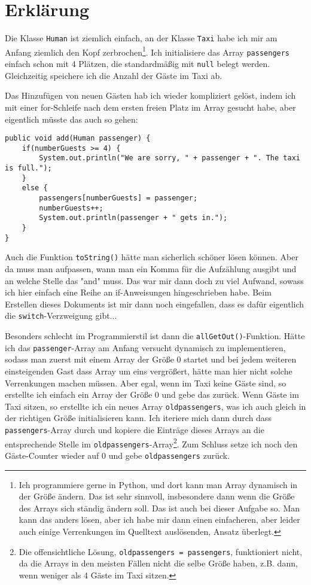 \documentclass{article}
\begin{document}
	\section*{Erklärung}
	Die Klasse \texttt{Human} ist ziemlich einfach, an der Klasse \texttt{Taxi} habe ich mir am Anfang ziemlich den Kopf zerbrochen\footnote{Ich programmiere gerne in Python, und dort kann man Array dynamisch in der Größe ändern. Das ist sehr sinnvoll, insbesondere dann wenn die Größe des Arrays sich ständig ändern soll. Das ist auch bei dieser Aufgabe so. Man kann das anders lösen, aber ich habe mir dann einen einfacheren, aber leider auch einige Verrenkungen im Quelltext auslösenden, Ansatz überlegt.}. Ich initialisiere das Array \texttt{passengers} einfach schon mit 4 Plätzen, die standardmäßig mit \texttt{null} belegt werden. Gleichzeitig speichere ich die Anzahl der Gäste im Taxi ab. 
	
	Das Hinzufügen von neuen Gästen hab ich wieder kompliziert gelöst, indem ich mit einer for-Schleife nach dem ersten freien Platz im Array gesucht habe, aber eigentlich müsste das auch so gehen:
	\begin{lstlisting}[style=java]
public void add(Human passenger) {
	if(numberGuests >= 4) {
		System.out.println("We are sorry, " + passenger + ". The taxi is full.");
	}
	else {
		passengers[numberGuests] = passenger;
		numberGuests++;
		System.out.println(passenger + " gets in.");
	}
}	
	\end{lstlisting}

	Auch die Funktion \texttt{toString()} hätte man sicherlich schöner lösen können. Aber da muss man aufpassen, wann man ein Komma für die Aufzählung ausgibt und an welche Stelle das "and" muss. Das war mir dann doch zu viel Aufwand, sowass ich  hier einfach eine Reihe an if-Anweisungen hingeschrieben habe. Beim Erstellen dieses Dokuments ist mir dann noch eingefallen, dass es dafür eigentlich die \texttt{switch}-Verzweigung gibt...
	
	Besonders schlecht im Programmierstil ist dann die \texttt{allGetOut()}-Funktion. Hätte ich das \texttt{passenger}-Array am Anfang versucht dynamisch zu implementieren, sodass man zuerst mit einem Array der Größe 0 startet und bei jedem weiteren einsteigenden Gast dass Array um eins vergrößert, hätte man hier nicht solche Verrenkungen machen müssen. Aber egal, wenn im Taxi keine Gäste sind, so erstellte ich einfach ein Array der Größe 0 und gebe das zurück. Wenn Gäste im Taxi sitzen, so erstellte ich ein neues Array \texttt{oldpassengers}, was ich auch gleich in der richtigen Größe initialisieren kann. Ich iteriere mich dann durch dass \texttt{passengers}-Array durch und kopiere die Einträge dieses Arrays an die entsprechende Stelle im \texttt{oldpassengers}-Array\footnote{Die offensichtliche Lösung, \texttt{oldpassengers = passengers}, funktioniert nicht, da die Arrays in den meisten Fällen nicht die selbe Größe haben, z.B. dann, wenn weniger als 4 Gäste im Taxi sitzen.}. Zum Schluss setze ich noch den Gäste-Counter wieder auf 0 und gebe \texttt{oldpassengers} zurück.
	
\end{document}
